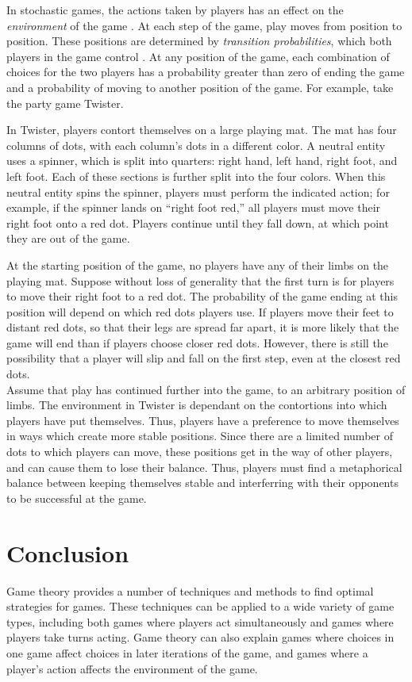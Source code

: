 In stochastic games, the actions taken by players has an effect on the \textit{environment} of the game \cite{sola15}. At each step of the game, play moves from position to position. These positions are determined by \textit{transition probabilities}, which both players in the game control \cite{shap53}. At any position of the game, each combination of choices for the two players has a probability greater than zero of ending the game and a probability of moving to another position of the game. For example, take the party game Twister.
\begin{exmp}
  In Twister, players contort themselves on a large playing mat. The mat has four columns of dots, with each column's dots in a different color. A neutral entity uses a spinner, which is split into quarters: right hand, left hand, right foot, and left foot. Each of these sections is further split into the four colors. When this neutral entity spins the spinner, players must perform the indicated action; for example, if the spinner lands on ``right foot red,'' all players must move their right foot onto a red dot. Players continue until they fall down, at which point they are out of the game.
\end{exmp}

At the starting position of the game, no players have any of their limbs on the playing mat. Suppose without loss of generality that the first turn is for players to move their right foot to a red dot. The probability of the game ending at this position will depend on which red dots players use. If players move their feet to distant red dots, so that their legs are spread far apart, it is more likely that the game will end than if players choose closer red dots. However, there is still the possibility that a player will slip and fall on the first step, even at the closest red dots.\\

Assume that play has continued further into the game, to an arbitrary position of limbs. The environment in Twister is dependant on the contortions into which players have put themselves. Thus, players have a preference to move themselves in ways which create more stable positions. Since there are a limited number of dots to which players can move, these positions get in the way of other players, and can cause them to lose their balance. Thus, players must find a metaphorical balance between keeping themselves stable and interferring with their opponents to be successful at the game.

\section{Conclusion}
Game theory provides a number of techniques and methods to find optimal strategies for games. These techniques can be applied to a wide variety of game types, including both games where players act simultaneously and games where players take turns acting. Game theory can also explain games where choices in one game affect choices in later iterations of the game, and games where a player's action affects the environment of the game.\\